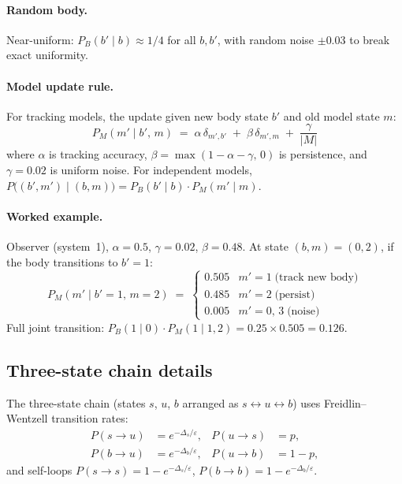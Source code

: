 \documentclass[12pt]{article}
\theoremstyle{remark}
\begin{document}
\paragraph{Random body.} Near-uniform: $P_B(b' \mid b) \approx 1/4$ for all $b, b'$, with random noise $\pm 0.03$ to break exact uniformity.

\paragraph{Model update rule.} For tracking models, the update given new body state $b'$ and old model state $m$:
\[
  P_M(m' \mid b',\, m) \;=\; \alpha\,\delta_{m',b'} \;+\; \beta\,\delta_{m',m} \;+\; \frac{\gamma}{|M|}
\]
where $\alpha$ is tracking accuracy, $\beta = \max(1 - \alpha - \gamma,\, 0)$ is persistence, and $\gamma = 0.02$ is uniform noise. For independent models, $P\bigl((b',m') \mid (b,m)\bigr) = P_B(b' \mid b)\cdot P_M(m' \mid m)$.

\paragraph{Worked example.} Observer (system~1), $\alpha = 0.5$, $\gamma = 0.02$, $\beta = 0.48$. At state $(b, m) = (0, 2)$, if the body transitions to $b' = 1$:
\[
  P_M(m' \mid b' = 1,\, m = 2) \;=\; \begin{cases}
    0.505 & m' = 1 \;\text{(track new body)}\\
    0.485 & m' = 2 \;\text{(persist)}\\
    0.005 & m' = 0,\, 3 \;\text{(noise)}
  \end{cases}
\]
Full joint transition: $P_B(1 \mid 0) \cdot P_M(1 \mid 1, 2) = 0.25 \times 0.505 = 0.126$.

\subsection{Three-state chain details}\label{app:three-state-details}

The three-state chain (states $s$, $u$, $b$ arranged as $s \leftrightarrow u \leftrightarrow b$) uses Freidlin--Wentzell transition rates:
\begin{align*}
  P(s \to u) &= e^{-\Delta_s/\varepsilon}, & P(u \to s) &= p, \\
  P(b \to u) &= e^{-\Delta_b/\varepsilon}, & P(u \to b) &= 1-p,
\end{align*}
and self-loops $P(s \to s) = 1 - e^{-\Delta_s/\varepsilon}$, $P(b \to b) = 1 - e^{-\Delta_b/\varepsilon}$.
\end{document}

